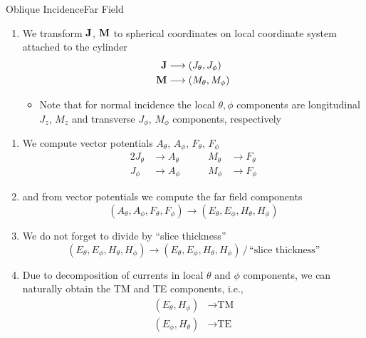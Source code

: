 \begin{frame}[allowframebreaks]{Oblique Incidence}{Far Field}
\begin{enumerate}
     \item We transform $\mathbf{J}$, $\mathbf{M}$ to spherical coordinates on local
       coordinate system attached to the cylinder
       \begin{align*}
         \mathbf{J} &\longrightarrow (J_\theta,J_\phi) \\
         \mathbf{M} &\longrightarrow (M_\theta,M_\phi) 
       \end{align*}
       
       \begin{itemize}
       \item Note that for normal incidence the local $\theta,\phi$
         components are longitudinal $J_z$, $M_z$ and transverse
         $J_\phi$, $M_\phi$ components, respectively
       \end{itemize}

       \saveenum

    \end{enumerate}


    \framebreak %

    
    \begin{enumerate}
      \resumeenum

    \item We compute vector potentials $A_\theta$, $A_\phi$,
      $F_\theta$, $F_\phi$
      \begin{alignat*}{2}
        J_\theta &\rightarrow A_\theta
        & \qquad M_\theta &\longrightarrow F_\theta \\
        J_\phi &\rightarrow A_\phi
        & \qquad M_\phi &\longrightarrow F_\phi
      \end{alignat*}
      

    \item and from vector potentials we compute the far field components
      \begin{equation*}
        (A_\theta,A_\phi,F_\theta,F_\phi) \longrightarrow (E_\theta,E_\phi,H_\theta,H_\phi)
      \end{equation*}

    \item We do not forget to divide by ``slice thickness''
      \begin{equation*}
        (E_\theta,E_\phi,H_\theta,H_\phi) \longrightarrow
             (E_\theta,E_\phi,H_\theta,H_\phi) \, / \, \text{``slice thickness''}
      \end{equation*}
      
    \item Due to decomposition of currents in \alert{local} $\theta$ and $\phi$
      components, we can \alert{naturally obtain the TM and TE components}, i.e.,
      \begin{align*}
        (E_\theta,H_\phi) &\longrightarrow \text{TM} \\
        (E_\phi,H_\theta) &\longrightarrow \text{TE} 
      \end{align*}


\end{enumerate}
\end{frame}
